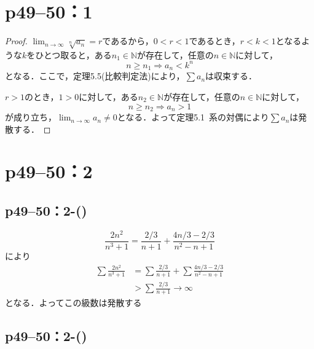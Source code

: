 \documentclass[a4paper,10pt,fleqn]{ltjsarticle}
\begin{document}
\section*{p49--50：1}

\begin{tleftbar}
    \begin{proof}
        $\lim_{n \to \infty} \sqrt[n]{a_n} =r$であるから，$0<r<1$であるとき，$r<k<1$となるような$k$をひとつ取ると，ある$n_1 \in \mathbb{N}$が存在して，任意の$n \in \mathbb{N}$に対して，
        \[
            n \ge n_1 \Longrightarrow a_n<k^n
        \]
        となる．ここで，定理5.5(比較判定法)により，$\sum a_n$は収束する．

        $r>1$のとき，$1>0$に対して，ある$n_2 \in \mathbb{N}$が存在して，任意の$n \in \mathbb{N}$に対して，
        \[
            n \ge n_2 \Longrightarrow a_n >1
        \]
        が成り立ち，$\lim_{n \to \infty} a_n \ne 0$となる．よって定理5.1~系の対偶により$\sum a_n$は発散する．
    \end{proof}
\end{tleftbar}


\section*{p49--50：2}


\subsection*{p49--50：2-()}

\begin{screen}
    \[
        \frac{2n^2}{n^3+1}=\frac{2/3}{n+1}+\frac{4n/3-2/3}{n^2-n+1}
    \]
    により
    \begin{align*}
        \sum \frac{2n^2}{n^3+1} & =\sum \frac{2/3}{n+1}+\sum \frac{4n/3-2/3}{n^2-n+1} \\
                                & >\sum \frac{2/3}{n+1} \rightarrow \infty
    \end{align*}
    となる．よってこの級数は発散する
\end{screen}


\subsection*{p49--50：2-()}
\end{document}
